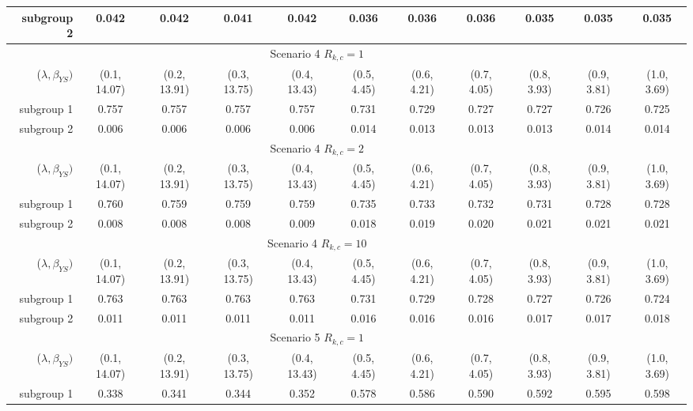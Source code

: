 \begin{tabular}{rcccc>{\columncolor[gray]{0.9}}cccccc}
subgroup 2              & 0.042        & 0.042        & 0.041        & 0.042        & 0.036       & 0.036       & 0.036       & 0.035       & 0.035       & 0.035       \\
\bottomrule  
\multicolumn{10}{c}{Scenario 4 $R_{k,c} = 1$}\\ 
\midrule 
($\lambda, \beta_{YS})$ & (0.1, 14.07) & (0.2, 13.91) & (0.3, 13.75) & (0.4, 13.43) & (0.5, 4.45) & (0.6, 4.21) & (0.7, 4.05) & (0.8, 3.93) & (0.9, 3.81) & (1.0, 3.69) \\
subgroup 1              & 0.757        & 0.757        & 0.757        & 0.757        & 0.731       & 0.729       & 0.727       & 0.727       & 0.726       & 0.725       \\
subgroup 2              & 0.006        & 0.006        & 0.006        & 0.006        & 0.014       & 0.013       & 0.013       & 0.013       & 0.014       & 0.014       \\
\bottomrule  
\multicolumn{10}{c}{Scenario 4 $R_{k,c} = 2$}\\ 
\midrule 
($\lambda, \beta_{YS})$ & (0.1, 14.07)&(0.2, 13.91)&(0.3, 13.75)&(0.4, 13.43)&(0.5, 4.45)&(0.6, 4.21)&(0.7, 4.05)&(0.8, 3.93)&(0.9, 3.81)&(1.0, 3.69) \\ 
subgroup 1 &0.760 &0.759 &0.759 &0.759 &0.735 &0.733 &0.732 &0.731 &0.728 &0.728 \\ 
subgroup 2 &0.008 &0.008 &0.008 &0.009 &0.018 &0.019 &0.020 &0.021 &0.021 &0.021 \\ 
\bottomrule  
\multicolumn{10}{c}{Scenario 4 $R_{k,c} = 10$}\\ 
\midrule 
($\lambda, \beta_{YS})$ & (0.1, 14.07)&(0.2, 13.91)&(0.3, 13.75)&(0.4, 13.43)&(0.5, 4.45)&(0.6, 4.21)&(0.7, 4.05)&(0.8, 3.93)&(0.9, 3.81)&(1.0, 3.69) \\ 
subgroup 1 &0.763 &0.763 &0.763 &0.763 &0.731 &0.729 &0.728 &0.727 &0.726 &0.724 \\ 
subgroup 2 &0.011 &0.011 &0.011 &0.011 &0.016 &0.016 &0.016 &0.017 &0.017 &0.018 \\ 
\bottomrule  
\multicolumn{10}{c}{Scenario 5 $R_{k,c} = 1$}\\ 
\midrule 
($\lambda, \beta_{YS})$ & (0.1, 14.07) & (0.2, 13.91) & (0.3, 13.75) & (0.4, 13.43) & (0.5, 4.45) & (0.6, 4.21) & (0.7, 4.05) & (0.8, 3.93) & (0.9, 3.81) & (1.0, 3.69) \\
subgroup 1              & 0.338        & 0.341        & 0.344        & 0.352        & 0.578       & 0.586       & 0.590       & 0.592       & 0.595       & 0.598       \\

\end{tabular}
